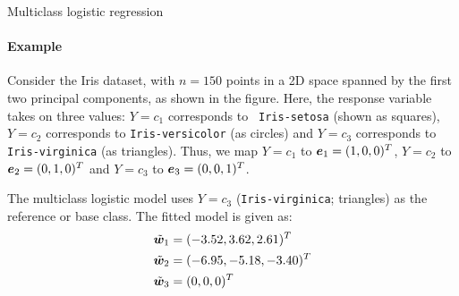%
%
\begin{frame}{Multiclass logistic regression}
\framesubtitle{Example}
    Consider the Iris dataset, with $n=150$ points
    in a 2D space spanned by the first two principal components, as
    shown in the figure.
Here, the response
    variable takes on three values: $Y=c_1$ corresponds to {\tt
    Iris-setosa} (shown as squares), $Y=c_2$ corresponds to {\tt Iris-versicolor}
    (as circles) 
    and $Y=c_3$ corresponds to {\tt Iris-virginica} (as triangles).
    Thus, we map $Y=c_1$ to ${\boldsymbol e}_1 = (1,0,0)^T$, $Y=c_2$ to ${\boldsymbol e}_2 =
    (0,1,0)^T$ and $Y=c_3$ to ${\boldsymbol e}_3 = (0,0,1)^T$. 


\medskip

    The multiclass logistic model uses $Y=c_3$ ({\tt Iris-virginica};
    triangles) as the reference or base
    class. The fitted model is given as:
    \begin{align*}
        \tilde{{\boldsymbol w}}_1 & = (-3.52, 3.62, 2.61)^T\\
        \tilde{{\boldsymbol w}}_2 & = (-6.95, -5.18, -3.40)^T\\
        \tilde{{\boldsymbol w}}_3 & = (0, 0, 0)^T
    \end{align*}
\end{frame}

